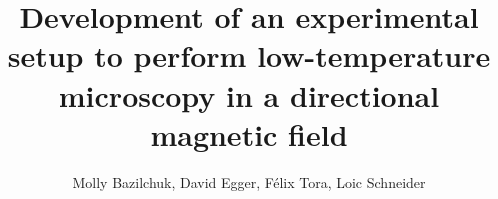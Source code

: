 \documentclass[journal,a4paper]{IEEEtran}
\begin{document}
%
\title{Development of an experimental setup to perform low-temperature microscopy in a directional magnetic field}
%
%
%

\author{Molly Bazilchuk, 
David Egger, 
Félix Tora, 
Loic Schneider}%

% 
%




% 
\end{document}
